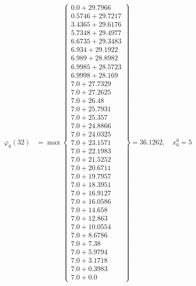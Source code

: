 \documentclass{article}
\begin{document}
\begin{align*}
  
\varphi_{6}(32) &= \max \left\{ \begin{array}{c}
0.0 + 29.7966 \\
 0.5746 + 29.7217 \\
 3.4365 + 29.6176 \\
 5.7348 + 29.4977 \\
 6.6735 + 29.3483 \\
 6.934 + 29.1922 \\
 6.989 + 28.8982 \\
 6.9985 + 28.5723 \\
 6.9998 + 28.169 \\
 7.0 + 27.7329 \\
 7.0 + 27.2625 \\
 7.0 + 26.48 \\
 7.0 + 25.7931 \\
 7.0 + 25.357 \\
 7.0 + 24.8866 \\
 7.0 + 24.0325 \\
 7.0 + 23.1571 \\
 7.0 + 22.1983 \\
 7.0 + 21.5252 \\
 7.0 + 20.6711 \\
 7.0 + 19.7957 \\
 7.0 + 18.3951 \\
 7.0 + 16.9127 \\
 7.0 + 16.0586 \\
 7.0 + 14.658 \\
 7.0 + 12.863 \\
 7.0 + 10.0554 \\
 7.0 + 8.6786 \\
 7.0 + 7.38 \\
 7.0 + 5.9794 \\
 7.0 + 3.1718 \\
 7.0 + 0.3983 \\
 7.0 + 0.0
\end{array} \right\}=36.1262,\quad x_{6}^0=5\\
  
  
  

\end{align*}
\end{document}
